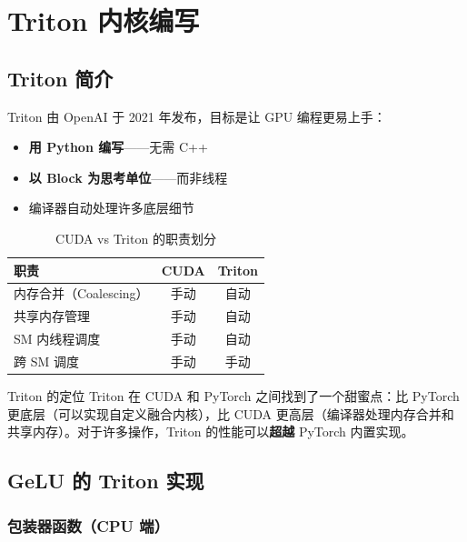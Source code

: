 \documentclass[a4paper]{article}
\begin{document}

\section{Triton 内核编写}

\subsection{Triton 简介}

Triton 由 OpenAI 于 2021 年发布，目标是让 GPU 编程更易上手：

\begin{itemize}
    \item \textbf{用 Python 编写}——无需 C++
    \item \textbf{以 Block 为思考单位}——而非线程
    \item 编译器自动处理许多底层细节
\end{itemize}

\begin{table}[H]
\centering
\begin{tabular}{lcc}
\toprule
\textbf{职责} & \textbf{CUDA} & \textbf{Triton} \\
\midrule
内存合并（Coalescing） & 手动 & 自动 \\
共享内存管理 & 手动 & 自动 \\
SM 内线程调度 & 手动 & 自动 \\
跨 SM 调度 & 手动 & 手动 \\
\bottomrule
\end{tabular}
\caption{CUDA vs Triton 的职责划分}
\end{table}

\begin{importantbox}{Triton 的定位}
Triton 在 CUDA 和 PyTorch 之间找到了一个甜蜜点：比 PyTorch 更底层（可以实现自定义融合内核），比 CUDA 更高层（编译器处理内存合并和共享内存）。对于许多操作，Triton 的性能可以\textbf{超越} PyTorch 内置实现。
\end{importantbox}

\subsection{GeLU 的 Triton 实现}

\subsubsection{包装器函数（CPU 端）}
\end{document}
